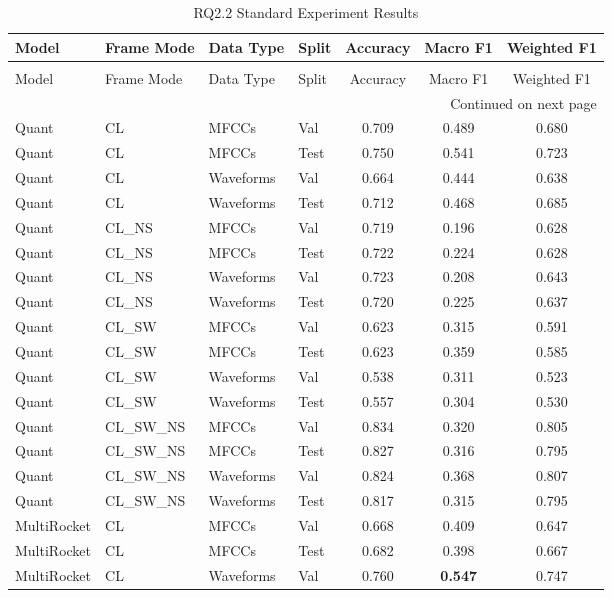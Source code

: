 \begin{longtable}{|l|l|l|l|c|c|c|}
\caption{RQ2.2 Standard Experiment Results} \label{tab:rq2.2_Standard_Results} \\
\toprule
Model & Frame Mode & Data Type & Split & Accuracy & Macro F1 & Weighted F1 \\
\midrule
\endfirsthead
\caption[]{RQ2.2 Standard Experiment Results} \\
\toprule
Model & Frame Mode & Data Type & Split & Accuracy & Macro F1 & Weighted F1 \\
\midrule
\endhead
\midrule
\multicolumn{7}{r}{Continued on next page} \\
\midrule
\endfoot
\bottomrule
\endlastfoot
Quant & CL & MFCCs & Val & 0.709 & 0.489 & 0.680 \\
Quant & CL & MFCCs & Test & 0.750 & 0.541 & 0.723 \\
Quant & CL & Waveforms & Val & 0.664 & 0.444 & 0.638 \\
Quant & CL & Waveforms & Test & 0.712 & 0.468 & 0.685 \\
Quant & CL\_NS & MFCCs & Val & 0.719 & 0.196 & 0.628 \\
Quant & CL\_NS & MFCCs & Test & 0.722 & 0.224 & 0.628 \\
Quant & CL\_NS & Waveforms & Val & 0.723 & 0.208 & 0.643 \\
Quant & CL\_NS & Waveforms & Test & 0.720 & 0.225 & 0.637 \\
Quant & CL\_SW & MFCCs & Val & 0.623 & 0.315 & 0.591 \\
Quant & CL\_SW & MFCCs & Test & 0.623 & 0.359 & 0.585 \\
Quant & CL\_SW & Waveforms & Val & 0.538 & 0.311 & 0.523 \\
Quant & CL\_SW & Waveforms & Test & 0.557 & 0.304 & 0.530 \\
Quant & CL\_SW\_NS & MFCCs & Val & 0.834 & 0.320 & 0.805 \\
Quant & CL\_SW\_NS & MFCCs & Test & 0.827 & 0.316 & 0.795 \\
Quant & CL\_SW\_NS & Waveforms & Val & 0.824 & 0.368 & 0.807 \\
Quant & CL\_SW\_NS & Waveforms & Test & 0.817 & 0.315 & 0.795 \\
MultiRocket & CL & MFCCs & Val & 0.668 & 0.409 & 0.647 \\
MultiRocket & CL & MFCCs & Test & 0.682 & 0.398 & 0.667 \\
MultiRocket & CL & Waveforms & Val & 0.760 & \textbf{0.547} & 0.747 \\

\end{longtable}
